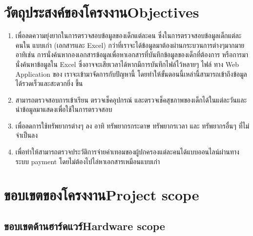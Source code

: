 \section{\ifcpe วัตถุประสงค์ของโครงงาน\else Objectives\fi}
\begin{enumerate}
    \item เพื่อลดความยุ่งยากในการตรวจสอบข้อมูลของเด็กแต่ละคน ซึ่งในการตรวจสอบข้อมูลเด็กแต่ละคนใน แบบเก่า (เอกสารและ Excel) กว่าที่เราจะได้ข้อมูลมาต้องผ่านกระบวนการต่างๆมากมาย อาทิเช่น การนั่งค้นหากองเอกสารข้อมูลเพื่อหาเอกสารที่บันทึกข้อมูลของเด็กที่ต้องการ หรือการมานั่งค้นหาข้อมูลใน Excel ซึ่งอาจจะเสียเวลาได้หากมีการบันทึกไฟล์ไว้หลายๆ ไฟล์ ทาง Web Application ของ เราจะเข้ามาจัดการกับปัญหานี้ โดยทําให้ขั้นตอนนี้เหล่านี้สามารถเข้าถึงข้อมูลได้รวดเร็วและสะดวกยิ่ง ขึ้น 

    \item สามารถตรวจสอบการเข้าเรียน ตรวจเช็คอุปกรณ์ และตรวจเช็คสุขภาพของเด็กได้ในแต่ละวันและนําข้อมูลมาแสดงเพื่อใช้ในการตรวจสอบ

    \item เพื่อลดการใช้ทรัพยากรต่างๆ ลง อาทิ ทรัพยากรกระดาษ ทรัพยากรเวลา และ ทรัพยากรอื่นๆ ที่ไม่จําเป็นลง
    \item เพื่อทำให้สามารถตรวจประวัติการจ่ายค่าเทอมของผู้ปกครองแต่ละคนได้แบบออนไลน์ผ่านทางระบบ payment โดยไม่ต้องไปไล่หาเอกสารเหมือนแบบเก่า

\end{enumerate}


\section{\ifcpe ขอบเขตของโครงงาน\else Project scope\fi}

\subsection{\ifcpe ขอบเขตด้านฮาร์ดแวร์\else Hardware scope\fi}


